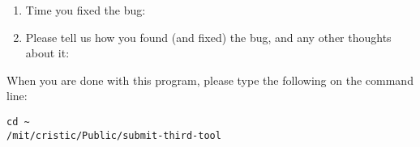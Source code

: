 \documentclass{article}
\begin{document}
\begin{flushleft}
\begin{enumerate}
\item{Time you fixed the bug:}

\item{Please tell us how you found (and fixed) the bug, and any other thoughts 
about it:}

\end{enumerate}

\vspace{0.45in}
When you are done with this program, please type the following on the 
command line:
\begin{verbatim}
cd ~
/mit/cristic/Public/submit-third-tool
\end{verbatim}


\end{flushleft}
\end{document}
